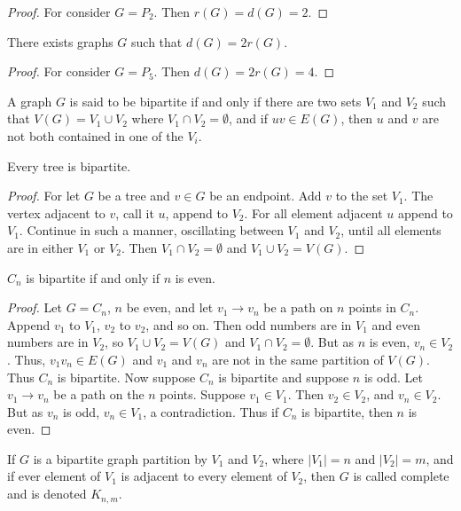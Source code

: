 \documentclass[crop=false,class=book,oneside]{standalone}
\begin{document}
        \begin{proof}
        For consider $G=P_2$. Then $r(G) = d(G) = 2$.
        \end{proof}
        \begin{corollary}
        There exists graphs $G$ such that $d(G) = 2r(G)$.
        \end{corollary}
        \begin{proof}
        For consider $G=P_5$. Then $d(G) = 2r(G) = 4$.
        \end{proof}
        \begin{definition}
        A graph $G$ is said to be bipartite if and only if there are two sets $V_1$ and $V_2$ such that $V(G) = V_1\cup V_2$ where $V_1\cap V_2 = \emptyset$, and if $uv \in E(G)$, then $u$ and $v$ are not both contained in one of the $V_i$.
        \end{definition}
        \begin{theorem}
        Every tree is bipartite.
        \end{theorem}
        \begin{proof}
        For let $G$ be a tree and $v\in G$ be an endpoint. Add $v$ to the set $V_1$. The vertex adjacent to $v$, call it $u$, append to $V_2$. For all element adjacent $u$ append to $V_1$. Continue in such a manner, oscillating between $V_1$ and $V_2$, until all elements are in either $V_1$ or $V_2$. Then $V_1 \cap V_2 = \emptyset$ and $V_1 \cup V_2 = V(G)$.
        \end{proof}
        \begin{theorem}
        $C_n$ is bipartite if and only if $n$ is even. 
        \end{theorem}
        \begin{proof}
        Let $G=C_n$, $n$ be even, and let $v_1\rightarrow v_n$ be a path on $n$ points in $C_n$. Append $v_1$ to $V_1$, $v_2$ to $v_2$, and so on. Then odd numbers are in $V_1$ and even numbers are in $V_2$, so $V_1\cup V_2 = V(G)$ and $V_1 \cap V_2 = \emptyset$. But as $n$ is even, $v_n \in V_2$. Thus, $v_1 v_n \in E(G)$ and $v_1$ and $v_n$ are not in the same partition of $V(G)$. Thus $C_n$ is bipartite. Now suppose $C_n$ is bipartite and suppose $n$ is odd. Let $v_1 \rightarrow v_n$ be a path on the $n$ points. Suppose $v_1 \in V_1$. Then $v_2 \in V_2$, and $v_n \in V_2$. But as $v_n$ is odd, $v_{n} \in V_1$, a contradiction. Thus if $C_n$ is bipartite, then $n$ is even.
        \end{proof}
        \begin{definition}
        If $G$ is a bipartite graph partition by $V_1$ and $V_2$, where $|V_1| = n$ and $|V_2| = m$, and if ever element of $V_1$ is adjacent to every element of $V_2$, then $G$ is called complete and is denoted $K_{n,m}$.
        \end{definition}
\end{document}
